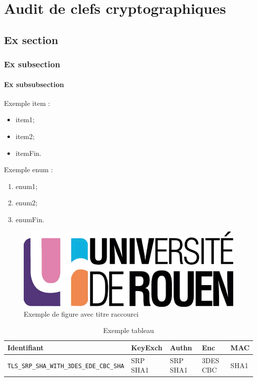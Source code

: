 \chapter{Audit de clefs cryptographiques}

\section{Ex section}
\subsection{Ex subsection}
\subsubsection{Ex subsubsection}


Exemple item  :
\begin{itemize}
\item item1;
\item item2;
\item itemFin.\\
\end{itemize}

Exemple enum : 
\begin{enumerate}
\item enum1;
\item enum2;
\item enumFin.\\
\end{enumerate}


\begin{figure}[H]
\begin{center}
\includegraphics[scale=0.2]{images/logo_univ.png}
\end{center}
\caption[Exemple 1]{Exemple de figure avec titre raccourci}
\label{fig1}
\end{figure}


\begin{table}
\centering
\begin{tabularx}{17cm}{|l|l|l|X|l|}
\hline
\textbf{Identifiant} & \textbf{KeyExch} & \textbf{Authn}& \textbf{Enc}& \textbf{MAC}\\
\hline
\verb+TLS_SRP_SHA_WITH_3DES_EDE_CBC_SHA+&SRP SHA1&SRP SHA1&3DES CBC&SHA1\\
\hline
\end{tabularx}
\caption{Exemple tableau}
\label{tableauEx}
\end{table}

